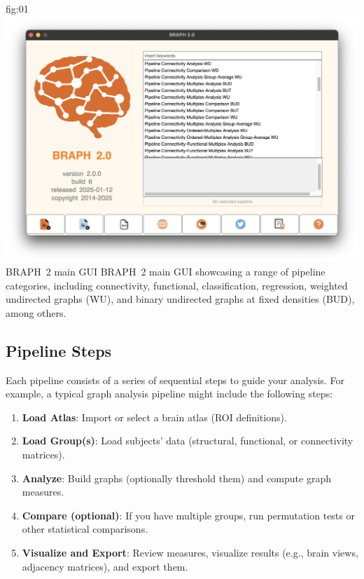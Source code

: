 \documentclass[justified]{tufte-handout}
\begin{document}
{fig:01}
{
	\includegraphics{fig01.png}
}
{BRAPH~2 main GUI}
{
	BRAPH~2 main GUI showcasing a range of pipeline categories, including connectivity, functional, classification, regression, weighted undirected graphs (WU), and binary undirected graphs at fixed densities (BUD), among others.
}


\subsection{Pipeline Steps}

Each pipeline consists of a series of sequential steps to guide your analysis. For example, a typical graph analysis pipeline might include the following steps:
\begin{enumerate}

\item \textbf{Load Atlas}: Import or select a brain atlas (ROI definitions).

\item \textbf{Load Group(s)}: Load subjects' data (structural, functional, or connectivity matrices).

\item \textbf{Analyze}: Build graphs (optionally threshold them) and compute graph measures.

\item \textbf{Compare (optional)}: If you have multiple groups, run permutation tests or other statistical comparisons.

\item \textbf{Visualize and Export}: Review measures, visualize results (e.g., brain views, adjacency matrices), and export them.

\end{enumerate}
\end{document}
